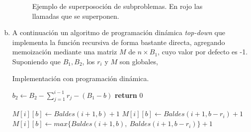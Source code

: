 \documentclass[12pt, a4paper]{report}
\theoremstyle{definition} %
\begin{document}
\begin{enumerate}[a)]
    \begin{figure}[H]
        \centering
        \caption{Ejemplo de superposoción de subproblemas. En rojo las llamadas que se superponen.}
    \end{figure}

    \item A continuación un algoritmo de programación dinámica \textit{top-down} que implementa la función recursiva de forma bastante directa, agregando memoización mediante una matriz $M$ de $n \times B_1$, cuyo valor por defecto es -1. Suponiendo que $B_1, B_2$, los $r_i$ y $M$ son globales,
    
    \begin{algorithm}[H]
        \caption{Implementación con programación dinámica.}
        \begin{algorithmic}[1]
                \State $b_2\gets B_2 - \sum_{j=1}^{i-1} r_j - (B_1 - b)$ 
                    \State \textbf{return} 0
                \EndIf

                 
                        \State $M[i][b] \gets Baldes(i + 1, b) + 1$
                        \State $M[i][b] \gets Baldes(i + 1, b - r_i) + 1$
                    \Else
                        \State $M[i][b] \gets max\{Baldes(i+1, b),\ Baldes(i+1, b - r_i)\} + 1$
                    \EndIf
                \EndIf


\end{algorithmic}
\end{algorithm}
\end{enumerate}
\end{document}
